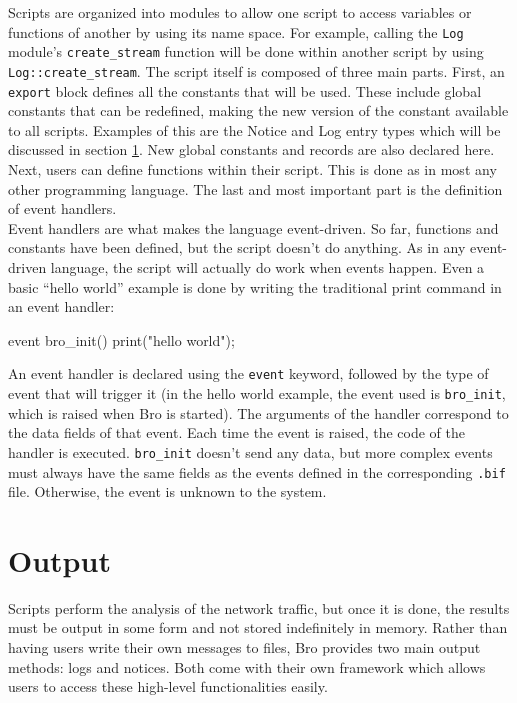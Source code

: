 Scripts are organized into modules to allow one script to access variables or functions of another by using its name space. For example, calling the \texttt{Log} module's \texttt{create\_stream} function will be done within another script by using \texttt{Log::create\_stream}. The script itself is composed of three main parts. First, an \texttt{export} block defines all the constants that will be used. These include global constants that can be redefined, making the new version of the constant available to all scripts. Examples of this are the Notice and Log entry types which will be discussed in section \ref{output}. New global constants and records are also declared here. Next, users can define functions within their script. This is done as in most any other programming language. The last and most important part is the definition of event handlers. \\

Event handlers are what makes the language event-driven. So far, functions and constants have been defined, but the script doesn't do anything. As in any event-driven language, the script will actually do work when events happen. Even a basic ``hello world'' example is done by writing the traditional print command in an event handler: \\

\begin{code}
event bro_init() {
	print("hello world\n");	
}
\end{code}

An event handler is declared using the \texttt{event} keyword, followed by the type of event that will trigger it (in the hello world example, the event used is \texttt{bro\_init}, which is raised when Bro is started). The arguments of the handler correspond to the data fields of that event. Each time the event is raised, the code of the handler is executed. \texttt{bro\_init} doesn't send any data, but more complex events must always have the same fields as the events defined in the corresponding \texttt{.bif} file. Otherwise, the event is unknown to the system.

\section{Output} \label{output}
Scripts perform the analysis of the network traffic, but once it is done, the results must be output in some form and not stored indefinitely in memory. Rather than having users write their own messages to files, Bro provides two main output methods: logs and notices. Both come with their own framework which allows users to access these high-level functionalities easily.

